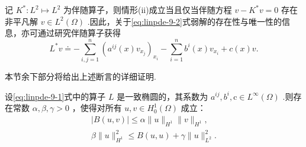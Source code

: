 记 ${K}^{ * } : {L}^{2} \mapsto  {L}^{2}$ 为伴随算子，则情形(ii)成立当且仅当伴随方程 $v - {K}^{ * }v = 0$ 存在非平凡解 $v \in  {L}^{2}\left( \Omega \right)$ .因此，关于\eqref{eq:linpde-9-2}式弱解的存在性与唯一性的信息，亦可通过研究伴随算子获得
\begin{equation}\tag{9.37}\label{eq:linpde-9-37}
{L}^{ * }v \doteq   - \sum_{{i,j = 1}}^{n}{\left( {a}^{ij}\left( x\right) {v}_{{x}_{j}}\right) }_{{x}_{i}} - \sum_{{i = 1}}^{n}{b}^{i}\left( x\right) {v}_{{x}_{i}} + c\left( x\right) v.
\end{equation}

本节余下部分将给出上述断言的详细证明.

\begin{lemma}\label{lem:linpde-9-12}
设\eqref{eq:linpde-9-1}式中的算子 $L$ 是一致椭圆的，其系数为 ${a}^{ij},{b}^{i},\mathrm{c} \in  {L}^{\infty }\left( \Omega \right)$ .则存在常数 $\alpha ,\beta ,\gamma  > 0$ ，使得对所有 $u,v \in  {H}_{0}^{1}\left( \Omega \right)$ 成立：
\begin{gather}\tag{9.38}\label{eq:linpde-9-38}
    \left| {B\left(  {u,v}\right)  }\right|  \leq  \alpha \| u{\| }_{{H}^{1}}\| v{\| }_{{H}^{1}}, \\ \tag{9.39}\label{eq:linpde-9-39}
    \beta \| u{\| }_{{H}^{1}}^{2} \leq  B\left(  {u,u}\right)   + \gamma \| u{\| }_{{L}^{2}}^{2}. 
\end{gather}
\end{lemma}

